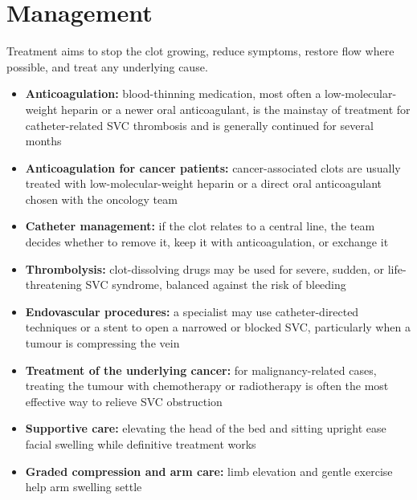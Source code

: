 \section*{Management}
Treatment aims to stop the clot growing, reduce symptoms, restore flow where possible, and treat any underlying cause.

\begin{itemize}
    \item \textbf{Anticoagulation:} blood-thinning medication, most often a low-molecular-weight heparin or a newer oral anticoagulant, is the mainstay of treatment for catheter-related SVC thrombosis and is generally continued for several months
    \item \textbf{Anticoagulation for cancer patients:} cancer-associated clots are usually treated with low-molecular-weight heparin or a direct oral anticoagulant chosen with the oncology team
    \item \textbf{Catheter management:} if the clot relates to a central line, the team decides whether to remove it, keep it with anticoagulation, or exchange it
    \item \textbf{Thrombolysis:} clot-dissolving drugs may be used for severe, sudden, or life-threatening SVC syndrome, balanced against the risk of bleeding
    \item \textbf{Endovascular procedures:} a specialist may use catheter-directed techniques or a stent to open a narrowed or blocked SVC, particularly when a tumour is compressing the vein
    \item \textbf{Treatment of the underlying cancer:} for malignancy-related cases, treating the tumour with chemotherapy or radiotherapy is often the most effective way to relieve SVC obstruction
    \item \textbf{Supportive care:} elevating the head of the bed and sitting upright ease facial swelling while definitive treatment works
    \item \textbf{Graded compression and arm care:} limb elevation and gentle exercise help arm swelling settle
\end{itemize}

